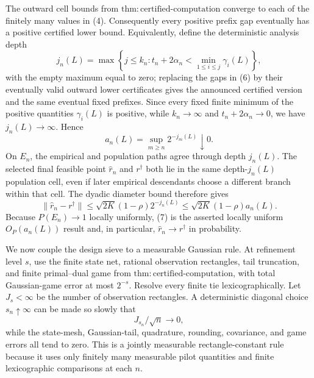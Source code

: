 The outward cell bounds from \(\mathrm{thm:certified\text{-}computation}\) converge to each of the finitely many values in (4).  Consequently every positive prefix gap eventually has a positive certified lower bound.  Equivalently, define the deterministic analysis depth
\[
j_n(L)=\max\left\{j\le k_n:
t_n+2\alpha_n<\min_{1\le i\le j}\gamma_i(L)
\right\},
\tag{6}
\]
with the empty maximum equal to zero; replacing the gaps in (6) by their eventually valid outward lower certificates gives the announced certified version and the same eventual fixed prefixes.  Since every fixed finite minimum of the positive quantities \(\gamma_i(L)\) is positive, while \(k_n\to\infty\) and \(t_n+2\alpha_n\to0\), we have \(j_n(L)\to\infty\).  Hence
\[
a_n(L)=\sup_{m\ge n}2^{-j_m(L)}\downarrow0.
\]
On \(E_n\), the empirical and population paths agree through depth \(j_n(L)\).  The selected final feasible point \(\widehat r_n\) and \(r^\dagger\) both lie in the same depth-\(j_n(L)\) population cell, even if later empirical descendants choose a different branch within that cell.  The dyadic diameter bound therefore gives
\[
\lVert\widehat r_n-r^\dagger\rVert
\le\sqrt{2K}(1-\rho)2^{-j_n(L)}
\le\sqrt{2K}(1-\rho)a_n(L).
\tag{7}
\]
Because \(P(E_n)\to1\) locally uniformly, (7) is the asserted locally uniform \(O_P(a_n(L))\) result and, in particular, \(\widehat r_n\to r^\dagger\) in probability.

We now couple the design sieve to a measurable Gaussian rule.  At refinement level \(s\), use the finite state net, rational observation rectangles, tail truncation, and finite primal--dual game from \(\mathrm{thm:certified\text{-}computation}\), with total Gaussian-game error at most \(2^{-s}\).  Resolve every finite tie lexicographically.  Let \(J_s<\infty\) be the number of observation rectangles.  A deterministic diagonal choice \(s_n\uparrow\infty\) can be made so slowly that
\[
J_{s_n}/\sqrt n\longrightarrow0,
\]
while the state-mesh, Gaussian-tail, quadrature, rounding, covariance, and game errors all tend to zero.  This is a jointly measurable rectangle-constant rule because it uses only finitely many measurable pilot quantities and finite lexicographic comparisons at each \(n\).

